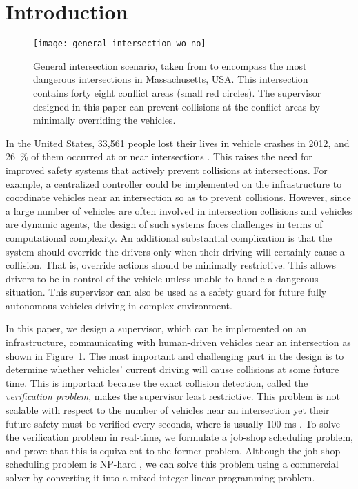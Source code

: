 \documentclass{sig-alternate}
\begin{document}


\section{Introduction}
\begin{figure}[t!]
\centering
\texttt{[image: general\_intersection\_wo\_no]}
\caption{General intersection scenario, taken from \cite{MassDOT_2012_Topcrash} to encompass the most dangerous intersections in Massachusetts, USA. This intersection contains forty eight conflict areas (small red circles). The supervisor designed in this paper can prevent collisions at the conflict areas by minimally overriding the vehicles.}
\label{figure:general_intersection}
\end{figure}

In the United States, 33,561 people lost their lives in vehicle crashes in 2012, and 26~\% of them occurred at or near intersections \cite{US_DOT_2012:overview}. This raises the need for improved safety systems that actively prevent collisions at intersections. For example, a centralized controller could be implemented on the infrastructure to coordinate vehicles near an intersection so as to prevent collisions. However, since a large number of vehicles are often involved in intersection collisions and vehicles are dynamic agents, the design of such systems faces challenges in terms of computational complexity. An additional substantial complication is that the system should override the drivers only when their driving will certainly cause a collision. That is, override actions should be minimally restrictive. This allows drivers to be in control of the vehicle unless unable to handle a dangerous situation. This supervisor can also be used as a safety guard for future fully autonomous vehicles driving in complex environment.

In this paper, we design a supervisor, which can be implemented on an infrastructure, communicating with human-driven vehicles near an intersection as shown in Figure~\ref{figure:general_intersection}. The most important and challenging part in the design is to determine whether vehicles' current driving will cause collisions at some future time. This is important because the exact collision detection, called the \textit{verification problem}, makes the supervisor least restrictive. This problem is not scalable with respect to the number of vehicles near an intersection yet their future safety must be verified every  seconds, where  is usually 100 ms \cite{US_plan_2015_2019}. To solve the verification problem in real-time, we formulate a job-shop scheduling problem, and prove that this is equivalent to the former problem. Although the job-shop scheduling problem is NP-hard \cite{garey_computers_1979}, we can solve this problem using a commercial solver by converting it into a mixed-integer linear programming problem. 
\end{document}

